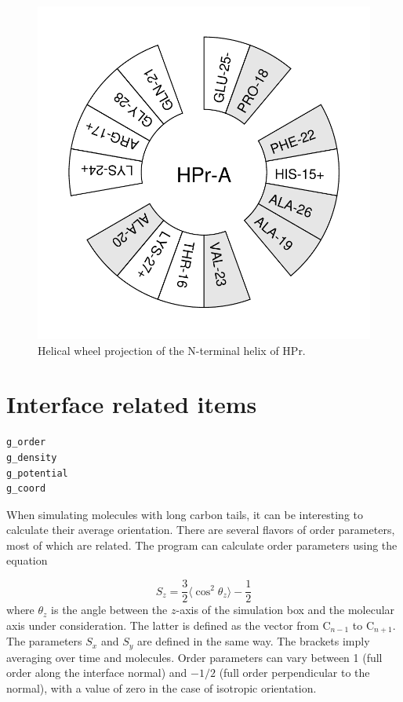 \begin{figure}
\centerline{\includegraphics[width=\htw]{plots/hpr-wheel}}
\caption{Helical wheel projection of the N-terminal helix of HPr.}
\label{fig:wheel}
\end{figure}


\section{Interface related items}
\begin{verbatim}
g_order
g_density
g_potential
g_coord
\end{verbatim}

When simulating molecules with long carbon tails, it can be
interesting to calculate their average orientation. There are several
flavors of order parameters, most of which are related. The program
{\tt {}} can calculate order parameters using the equation

\begin{equation}
S_{z} = \frac{3}{2}\langle {\cos^2{\theta_z}} \rangle - \frac{1}{2}
\label{eqn:Sgr}
\end{equation}
where $\theta_z$ is the angle between the $z$-axis of the simulation
box and the molecular axis under consideration. The latter is defined as the
vector from C$_{n-1}$ to C$_{n+1}$. The parameters $S_x$
and $S_y$ are defined in the same way. The brackets imply averaging over time
and molecules. Order parameters can vary between 1 (full order along
the interface normal) and $-1/2$ (full order perpendicular to the
normal), with a value of zero in the case of isotropic orientation.

